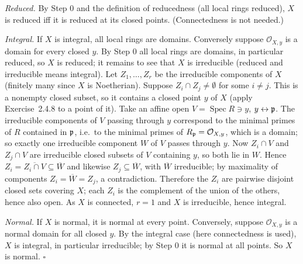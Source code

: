 \documentclass[11pt]{article}
\begin{document}
\emph{Reduced.} By Step 0 and the definition of reducedness (all local rings reduced), $X$ is reduced iff it is reduced at its closed points. (Connectedness is not needed.)

\emph{Integral.} If $X$ is integral, all local rings are domains. Conversely suppose $\mathcal O_{X,y}$ is a domain for every closed $y$. By Step 0 all local rings are domains, in particular reduced, so $X$ is reduced; it remains to see that $X$ is irreducible (reduced and irreducible means integral). Let $Z_1,\dots,Z_r$ be the irreducible components of $X$ (finitely many since $X$ is Noetherian). Suppose $Z_i\cap Z_j\neq\emptyset$ for some $i\neq j$. This is a nonempty closed subset, so it contains a closed point $y$ of $X$ (apply Exercise~2.4.8 to a point of it). Take an affine open $V=\operatorname{Spec}R\ni y$, $y\leftrightarrow\mathfrak p$. The irreducible components of $V$ passing through $y$ correspond to the minimal primes of $R$ contained in $\mathfrak p$, i.e.\ to the minimal primes of $R_\mathfrak p=\mathcal O_{X,y}$, which is a domain; so exactly one irreducible component $W$ of $V$ passes through $y$. Now $Z_i\cap V$ and $Z_j\cap V$ are irreducible closed subsets of $V$ containing $y$, so both lie in $W$. Hence $Z_i=\overline{Z_i\cap V}\subseteq\overline W$ and likewise $Z_j\subseteq\overline W$, with $\overline W$ irreducible; by maximality of components $Z_i=\overline W=Z_j$, a contradiction. Therefore the $Z_i$ are pairwise disjoint closed sets covering $X$; each $Z_i$ is the complement of the union of the others, hence also open. As $X$ is connected, $r=1$ and $X$ is irreducible, hence integral.

\emph{Normal.} If $X$ is normal, it is normal at every point. Conversely, suppose $\mathcal O_{X,y}$ is a normal domain for all closed $y$. By the integral case (here connectedness is used), $X$ is integral, in particular irreducible; by Step 0 it is normal at all points. So $X$ is normal. \hfill$\square$
\end{document}
